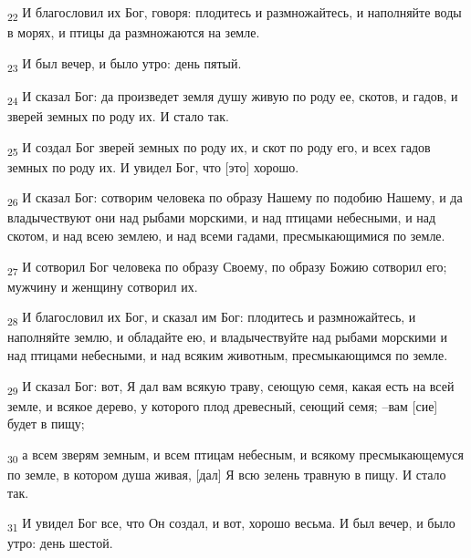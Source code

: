 \begin{tcolorbox}
\textsubscript{22} И благословил их Бог, говоря: плодитесь и размножайтесь, и наполняйте воды в морях, и птицы да размножаются на земле.
\end{tcolorbox}
\begin{tcolorbox}
\textsubscript{23} И был вечер, и было утро: день пятый.
\end{tcolorbox}
\begin{tcolorbox}
\textsubscript{24} И сказал Бог: да произведет земля душу живую по роду ее, скотов, и гадов, и зверей земных по роду их. И стало так.
\end{tcolorbox}
\begin{tcolorbox}
\textsubscript{25} И создал Бог зверей земных по роду их, и скот по роду его, и всех гадов земных по роду их. И увидел Бог, что [это] хорошо.
\end{tcolorbox}
\begin{tcolorbox}
\textsubscript{26} И сказал Бог: сотворим человека по образу Нашему по подобию Нашему, и да владычествуют они над рыбами морскими, и над птицами небесными, и над скотом, и над всею землею, и над всеми гадами, пресмыкающимися по земле.
\end{tcolorbox}
\begin{tcolorbox}
\textsubscript{27} И сотворил Бог человека по образу Своему, по образу Божию сотворил его; мужчину и женщину сотворил их.
\end{tcolorbox}
\begin{tcolorbox}
\textsubscript{28} И благословил их Бог, и сказал им Бог: плодитесь и размножайтесь, и наполняйте землю, и обладайте ею, и владычествуйте над рыбами морскими и над птицами небесными, и над всяким животным, пресмыкающимся по земле.
\end{tcolorbox}
\begin{tcolorbox}
\textsubscript{29} И сказал Бог: вот, Я дал вам всякую траву, сеющую семя, какая есть на всей земле, и всякое дерево, у которого плод древесный, сеющий семя; --вам [сие] будет в пищу;
\end{tcolorbox}
\begin{tcolorbox}
\textsubscript{30} а всем зверям земным, и всем птицам небесным, и всякому пресмыкающемуся по земле, в котором душа живая, [дал] Я всю зелень травную в пищу. И стало так.
\end{tcolorbox}
\begin{tcolorbox}
\textsubscript{31} И увидел Бог все, что Он создал, и вот, хорошо весьма. И был вечер, и было утро: день шестой.
\end{tcolorbox}
